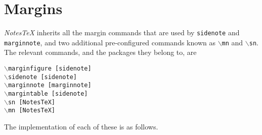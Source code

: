 

\newpage


\section{Margins}\label{Sec:Margins}%
\textit{NotesTeX} inherits all the margin commands that are used by \texttt{sidenote} and \texttt{marginnote}, and two additional pre-configured commands known as \texttt{$\backslash$mn} and \texttt{$\backslash$sn}. The relevant commands, and the packages they belong to, are
\begin{center}
  \begin{multicols}{2}
  \noindent\texttt{$\backslash$marginfigure~[sidenote]\\
  $\backslash$sidenote~[sidenote]\\
  $\backslash$marginnote~[marginnote]\\
  $\backslash$margintable~[sidenote]\\
  $\backslash$sn~[NotesTeX]\\
  $\backslash$mn~[NotesTeX]\\
  }
\end{multicols}
\end{center}
The implementation of each of these is as follows.
